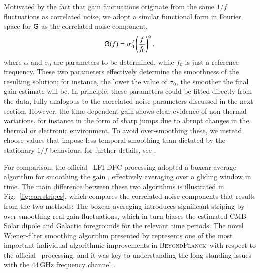 \documentclass[onecolumn]{aa}
\newcommand{\BP}{\textsc{BeyondPlanck}}
\begin{document}
Motivated by the fact that gain fluctuations originate from the same
$1/f$ fluctuations as correlated noise, we adopt a similar functional
form in Fourier space for $\mathsf{G}$ as the correlated noise component,
\begin{equation}
    \mathsf{G}(f) = \sigma_0^2\left(\frac{f}{f_0}\right)^\alpha,
\end{equation}
where $\alpha$ and $\sigma_0$ are parameters to be determined, while
$f_0$ is just a reference frequency. These two parameters effectively
determine the smoothness of the resulting solution; for instance, the
lower the value of $\sigma_0$, the smoother the final gain estimate
will be. In principle, these parameters could be fitted directly from
the data, fully analogous to the correlated noise parameters discussed
in the next section. However, the time-dependent gain shows clear
evidence of non-thermal variations, for instance in the form of
sharp jumps due to abrupt changes in the thermal or electronic
environment. To avoid over-smoothing these, we instead choose values
that impose less temporal smoothing than dictated by the stationary
$1/f$ behaviour; for further details, see \citet{bp07}.

For comparison, the official \Planck\ LFI DPC processing adopted a
boxcar average algorithm for smoothing the gain
\citep{planck2014-a03}, effectively averaging over a gliding window in
time. The main difference between these two algorithms is illustrated
in Fig.~\ref{fig:corrstripes}, which compares the correlated noise
components that results from the two methods: The boxcar averaging
introduces significant striping by over-smoothing real gain
fluctuations, which in turn biases the estimated CMB Solar dipole and
Galactic foregrounds for the relevant time periods. The novel
Wiener-filter smoothing algorithm presented by \citet{bp07} represents
one of the most important individual algorithmic improvements in
\BP\ with respect to the official \Planck\ processing, and it was key
to understanding the long-standing issues with the 44\,GHz frequency
channel \citep{planck2016-l02}. 
\end{document}
